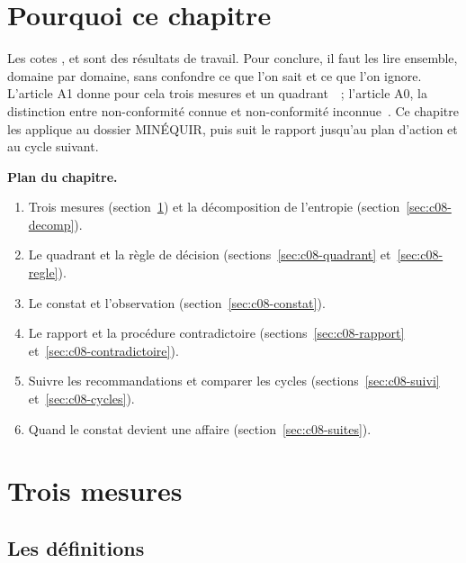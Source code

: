 \bigskip

\section*{Pourquoi ce chapitre}

Les cotes \OUI{}, \NON{} et \NEK{} sont des résultats de travail. Pour
conclure, il faut les lire ensemble, domaine par domaine, sans confondre ce
que l'on sait et ce que l'on ignore. L'article A1 donne pour cela trois
mesures et un quadrant~\cite{minka2026nek}~; l'article A0, la distinction
entre non-conformité connue et non-conformité
inconnue~\cite{minka2026auditologie}. Ce chapitre les applique au dossier
MINÉQUIR, puis suit le rapport jusqu'au plan d'action et au cycle suivant.

\medskip
\textbf{Plan du chapitre.}
\begin{enumerate}
    \item Trois mesures (section~\ref{sec:c08-mesures}) et la décomposition de
          l'entropie (section~\ref{sec:c08-decomp}).
    \item Le quadrant et la règle de décision (sections~\ref{sec:c08-quadrant}
          et~\ref{sec:c08-regle}).
    \item Le constat et l'observation (section~\ref{sec:c08-constat}).
    \item Le rapport et la procédure contradictoire
          (sections~\ref{sec:c08-rapport} et~\ref{sec:c08-contradictoire}).
    \item Suivre les recommandations et comparer les cycles
          (sections~\ref{sec:c08-suivi} et~\ref{sec:c08-cycles}).
    \item Quand le constat devient une affaire (section~\ref{sec:c08-suites}).
\end{enumerate}

\separateur

\section{Trois mesures}
\label{sec:c08-mesures}

\subsection{Les définitions}

